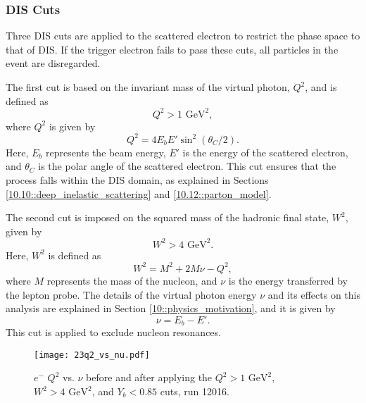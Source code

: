 \subsubsection{DIS Cuts}
\label{13.23::dis_cuts}
    Three DIS cuts are applied to the scattered electron to restrict the phase space to that of DIS.
    If the trigger electron fails to pass these cuts, all particles in the event are disregarded.

    The first cut is based on the invariant mass of the virtual photon, $Q^2$, and is defined as
    \begin{equation*}
        Q^2 > 1 \text{ GeV}^2,
    \end{equation*}
    where $Q^2$ is given by
    \begin{equation}
        Q^2 = 4E_bE'\sin^2(\theta_C/2).
        \label{eq::13.23::q2}
    \end{equation}
    Here, $E_b$ represents the beam energy, $E'$ is the energy of the scattered electron, and $\theta_C$ is the polar angle of the scattered electron.
    This cut ensures that the process falls within the DIS domain, as explained in Sections \ref{10.10::deep_inelastic_scattering} and \ref{10.12::parton_model}.

    The second cut is imposed on the squared mass of the hadronic final state, $W^2$, given by
    \begin{equation*}
        W^2 > 4 \text{ GeV}^2.
    \end{equation*}
    Here, $W^2$ is defined as
    \begin{equation*}
        W^2 = M^2 + 2M\nu - Q^2,
    \end{equation*}
    where $M$ represents the mass of the nucleon, and $\nu$ is the energy transferred by the lepton probe.
    The details of the virtual photon energy $\nu$ and its effects on this analysis are explained in Section \ref{10::physics_motivation}, and it is given by
    \begin{equation}
        \nu = E_b - E'.
        \label{eq::13.23::nu}
    \end{equation}
    This cut is applied to exclude nucleon resonances.

    \begin{figure}[b!]
        \texttt{[image: 23q2\_vs\_nu.pdf]}
        \caption[$Q^2$ vs. $\nu$ comparison]
        {$e^-$ $Q^2$ vs. $\nu$ before and after applying the $Q^2 > 1 \text{ GeV}^2$, $W^2 > 4 \text{ GeV}^2$, and $Y_b < 0.85$ cuts, run 12016.}
        \label{fig::13.23::q2_vs_nu}
    \end{figure}

